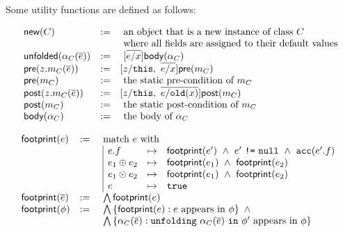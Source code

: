 \noindent
Some utility functions are defined as follows:
%
%
%
\begin{spacing}{1.25} \begin{align*} \begin{array}{lcl}
%
\tsf{new}(C) & :=
  & \ \text{an object that is a new instance of class $C$} \\ &
  & \ \text{where all fields are assigned to their default values}
\\
\tsf{unfolded}(\alpha_C(\overline{e})) & :=
  & \ [ \overline{e/x} ] \tsf{body}(\alpha_C)
\\
\tsf{pre}(z.m_C(\overline{e})) & := & [ z/\code{this}, \ \overline{e/x} ] \tsf{pre}(m_C) \\
\tsf{pre}(m_C) & := & \ \text{the static pre-condition of} \ m_C \\
\tsf{post}(z.m_C(\overline{e})) & := &  [ z/\code{this}, \ \overline{e/\code{old}(x)} ] \tsf{post}(m_C) \\
\tsf{post}(m_C) & := & \ \text{the static post-condition of} \ m_C \\
\tsf{body}(\alpha_C) & := & \ \text{the body of} \ \alpha_C \\
%
\end{array} \end{align*} \end{spacing}
%
%
%
\begin{spacing}{1.25} \begin{align*} \begin{array}{lcl}
\textsf{footprint}(e) & :=
  & \ \text{match} \ e \ \text{with} \\ &
  & \ \begin{array}{|lcl}
        e.f &\mapsto&
          \textsf{footprint}(e^\prime) \ \land \
          e^\prime \ \texttt{!=} \ \texttt{null} \ \land \
          \texttt{acc}(e^\prime.f) \\
        e_1 \oplus e_2 &\mapsto&
          \textsf{footprint}(e_1) \ \land \ \textsf{footprint}(e_2) \\
        e_1 \odot e_2 &\mapsto&
          \textsf{footprint}(e_1) \ \land \ \textsf{footprint}(e_2) \\
        e &\mapsto&
          \texttt{true}
    \end{array}
\\
\textsf{footprint}(\overline{e}) & :=
  & \ \bigwedge \textsf{footprint}(e)
\\
\textsf{footprint}(\phi) & :=
  & \ \bigwedge\left\{  \textsf{footprint}(e) : e \ \text{appears in} \ \phi  \right\} \ \land \\ &
  & \ \bigwedge\left\{  \alpha_C(\overline{e}) : \texttt{unfolding} \ \alpha_C(\overline{e}) \ \texttt{in} \ \phi^\prime \
                                              \text{appears in} \ \phi  \right\}
\end{array} \end{align*} \end{spacing}
